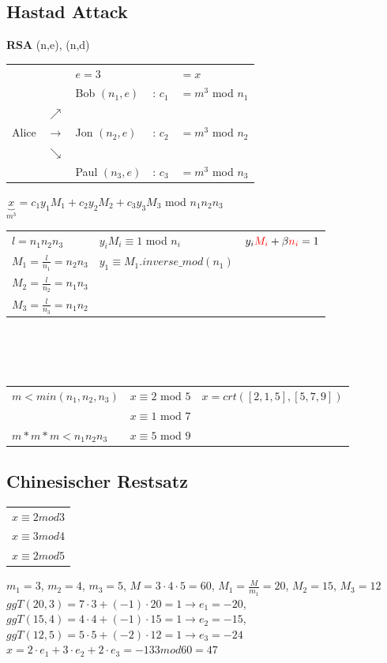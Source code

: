 \documentclass[landscape,twocolumn,a4paper]{article}
\begin{document}
\subsection{Hastad Attack}
\textbf{RSA} (n,e), (n,d) \\
\begin{tabular}{l l l l l}
    & & {\color{red} $e=3$} & & $=x$ \\
	&  & Bob $(n_1,e)$ & : {\color{red}$c_1$} & $= m^3$ mod $n_1$\\
	&$\nearrow$  \\
	Alice & $\rightarrow$ & Jon $(n_2,e)$ & : {\color{red}$c_2$} & $= m^3$ mod $n_2$\\
	& $\searrow$ \\
	& & Paul $(n_3,e)$ & : {\color{red}$c_3$} & $= m^3$ mod $n_3$\\
\end{tabular}

$\underbrace{x}_{m^3} = c_1 y_1 M_1 + c_2 y_2 M_2 + c_3 y_3 M_3$ mod $n_1n_2n_3$ \\ 

\begin{tabular}{p{4cm}  p{4cm} l }
	$l=n_1n_2n_3$ & $y_iM_i\equiv 1$ mod $n_i$ & $y_i{\color{red}M_i} + \beta {\color{red}n_i}=1$\\
	$M_1 = \frac{l}{n_1} = n_2n_3$ & $y_1\equiv M_1.inverse\_mod(n_1)$ \\
	$M_2 = \frac{l}{n_2} = n_1n_3$ \\
	$M_3 = \frac{l}{n_3} = n_1n_2$ \\
\end{tabular} \\ \\
\\
\begin{tabular}{p{4cm}  p{4cm} l }
	$m < min(n_1,n_2,n_3)$ & $x\equiv2$ mod $5$ & $x= crt([2,1,5],[5,7,9])$ \\
	& $x\equiv1$ mod $7$ \\
	$m*m*m < n_1n_2n_3$ & $x\equiv5$ mod $9$ & \\
\end{tabular}
\subsection{Chinesischer Restsatz}
\begin{tabular}{l}
 $x\equiv 2 mod 3$\\
 $x\equiv 3 mod 4$\\
 $x\equiv 2 mod 5$
\end{tabular}
 $m_1=3$, $m_2=4$, $m_3=5$, $M=3\cdot4\cdot5=60$, $M_1=\frac{M}{m_1}=20$, $M_2=15$, $M_3=12$\\
 $ggT(20,3)=7\cdot3+(-1)\cdot20 = 1 \to e_1=-20$, $ggT(15,4)=4\cdot4+(-1)\cdot15 = 1 \to e_2=-15$, $ggT(12,5)=5\cdot5+(-2)\cdot12 = 1 \to e_3=-24$\\
 $x=2\cdot e_1+3\cdot e_2+2\cdot e_3=-133 mod 60=47$ 
\end{document}
